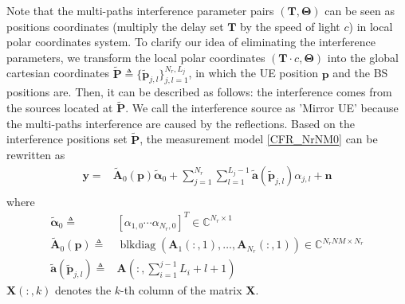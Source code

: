 \documentclass[journal]{IEEEtran}
\def \blkdiag{\operatorname{blkdiag}}
\begin{document}
Note that the multi-paths interference parameter pairs $(\mathbf{T},\boldsymbol{\Theta})$ can be seen as positions coordinates (multiply the delay set $\mathbf{T}$ by the speed of light $c$) in local polar coordinates system.
To clarify our idea of eliminating the interference parameters, we transform the local polar coordinates $(\mathbf{T}\cdot c,\boldsymbol{\Theta})$ into the global cartesian coordinates $\tilde{\boldsymbol{P}}\triangleq \{\tilde{\boldsymbol{p}}_{j,l}\}_{j,l=1}^{N_r,L_j}$, in which the UE position $\boldsymbol{p}$ and the BS positions are. Then, it can be described as follows: the interference comes from the sources located at $\tilde{\boldsymbol{P}}$. We call the interference source as 'Mirror UE' because the multi-paths interference are caused by the reflections. Based on the interference positions set $\tilde{\boldsymbol{P}}$, the measurement model \eqref{CFR_NrNM0} can be rewritten as
\begin{align}\label{CFR_MirrorUE0}
  \boldsymbol{y}=&\tilde{\boldsymbol{A}}_0(\boldsymbol{p})\tilde{\boldsymbol{\alpha}}_0+\sum_{j=1}^{N_r}\sum_{l=1}^{L_j-1}\tilde{\boldsymbol{a}}(\tilde{\boldsymbol{p}}_{j,l})\alpha_{j,l}+\boldsymbol{n}\\\nonumber
\end{align}
where 
\begin{align}\label{CFR_MirrorUE1}
  \tilde{\boldsymbol{\alpha}}_0\triangleq&[\alpha_{1,0}\cdots \alpha_{N_r,0}]^T\in \mathbb{C}^{N_r\times 1}\\\nonumber
  \tilde{\boldsymbol{A}}_0(\boldsymbol{p})\triangleq&\blkdiag(\boldsymbol{A}_1(:,1),\dots ,\boldsymbol{A}_{N_r}(:,1))\in \mathbb{C}^{N_rNM\times N_r}\\\nonumber
  \tilde{\boldsymbol{a}}(\tilde{\boldsymbol{p}}_{j,l})\triangleq&\boldsymbol{A}(:,\sum_{i=1}^{j-1}L_i+l+1)
\end{align}
$\boldsymbol{X}(:,k)$ denotes the $k$-th column of the matrix $\boldsymbol{X}$.
\end{document}
